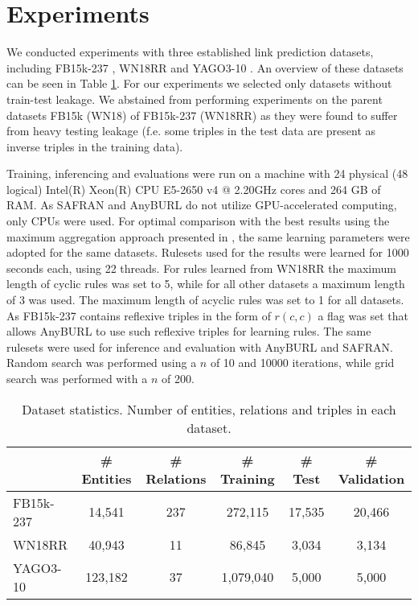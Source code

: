 \documentclass[akbc,twoside,11pt,lettersize]{article}
\begin{document}
\section{Experiments}



We conducted experiments with three established link prediction datasets, including FB15k-237 \cite{toutanova_2015}, WN18RR \cite{dettmers_2018} and YAGO3-10 \cite{dettmers_2018}. An overview of these datasets can be seen in Table \ref{datasetsoverview}. For our experiments we selected only datasets without train-test leakage. We abstained from performing experiments on the parent datasets FB15k (WN18) \cite{bordes_2013} of FB15k-237 (WN18RR) as they were found to suffer from heavy testing leakage (f.e. some triples in the test data are present as inverse triples in the training data).


Training, inferencing and evaluations were run on a machine with 24 physical (48 logical) Intel(R) Xeon(R) CPU E5-2650 v4 @ 2.20GHz cores and 264 GB of RAM. As SAFRAN and AnyBURL do not utilize GPU-accelerated computing, only CPUs were used. For optimal comparison with the best results using the maximum aggregation approach presented in \cite{meilicke_2020}, the same learning parameters were adopted for the same datasets. Rulesets used for the results were learned for 1000 seconds each, using 22 threads. For rules learned from WN18RR the maximum length of cyclic rules was set to 5, while for all other datasets a maximum length of 3 was used. The maximum length of acyclic rules was set to 1 for all datasets. As FB15k-237 contains reflexive triples in the form of $r(c,c)$ a flag was set that allows AnyBURL to use such reflexive triples for learning rules. The same rulesets were used for inference and evaluation with AnyBURL and SAFRAN. Random search was performed using a $n$ of 10 and 10000 iterations, while grid search was performed with a $n$ of 200.


\begin{table}[t]
\centering
\begin{tabular}{lccccc}
\hline
          & \# Entities & \# Relations & \# Training & \# Test & \# Validation \\ \hline
FB15k-237 & 14,541   & 237       & 272,115      & 17,535   & 20,466         \\
WN18RR    & 40,943   & 11        & 86,845       & 3,034    & 3,134          \\
YAGO3-10  & 123,182  & 37        & 1,079,040    & 5,000    & 5,000          \\
\hline
\end{tabular}
\caption{ Dataset statistics. Number of entities, relations and triples in each dataset. }
\label{datasetsoverview}
\end{table}
\end{document}
